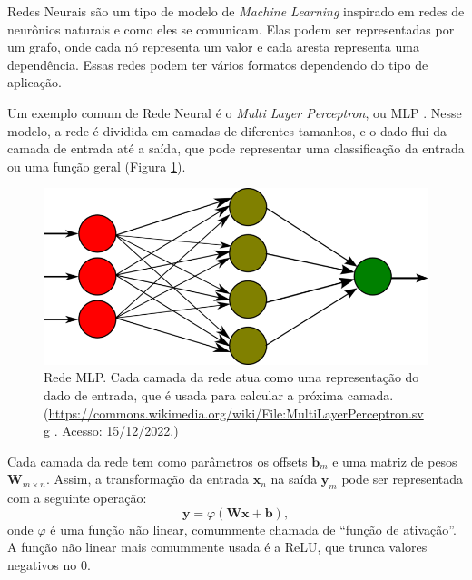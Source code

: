 Redes Neurais são um tipo 
de modelo de \textit{Machine Learning} inspirado
em redes de neurônios naturais e como
eles se comunicam. Elas podem ser
representadas por um grafo, onde
cada nó representa um valor e cada aresta
representa uma dependência. Essas
redes podem ter vários formatos
dependendo do tipo de aplicação.

Um exemplo comum de Rede Neural é o \textit{Multi Layer
	Perceptron}, ou MLP \cite{Zhang2015}. Nesse modelo, a rede é dividida
em camadas de diferentes tamanhos, e o dado
flui da camada de entrada até a saída,
que pode representar uma classificação
da entrada ou uma função geral (Figura \ref{mlp}).


\begin{figure}[!ht]
	\centering
	\includegraphics[width=\linewidth*2/3]{files/assets/deeplearning/mlp.png}
	\caption{Rede MLP. Cada camada da
	rede atua como uma representação do dado de entrada, que
	é usada para calcular a próxima camada.
	(\url{https://commons.wikimedia.org/wiki/File:MultiLayerPerceptron.svg}
	. Acesso: 15/12/2022.)}
	\label{mlp}
\end{figure}


Cada camada da rede tem como parâmetros os offsets 
$\mathbf{b}_m$ e uma matriz de pesos $\mathbf{W}_{m\times n}$.
Assim, a transformação da entrada $\mathbf{x}_n$ na saída
$\mathbf{y}_m$ pode ser representada com a seguinte operação:
\begin{equation}
	\mathbf{y} = 
	\varphi\left( \mathbf{W}\mathbf{x} + \mathbf{b} \right),
\end{equation}
onde $\varphi$ é uma função não linear, comummente chamada
de ``função de ativação''. A função não linear
mais comummente usada é a ReLU, que trunca valores
negativos no $0$.

